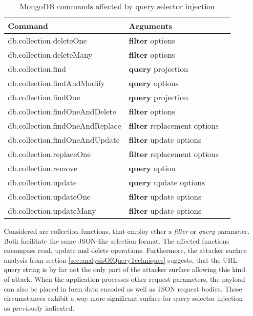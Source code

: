 \begin{table}[h]
 \sffamily
 \centering
 \begin{tabular}{lll}
  \textbf{Command} & \textbf{Arguments} \\ \hline
  db.collection.deleteOne         & \textbf{filter} options \\
  db.collection.deleteMany        & \textbf{filter} options \\
  db.collection.find              & \textbf{query} projection \\
  db.collection.findAndModify     & \textbf{query} options \\
  db.collection.findOne           & \textbf{query} projection \\
  db.collection.findOneAndDelete  & \textbf{filter} options \\
  db.collection.findOneAndReplace & \textbf{filter} replacement options \\
  db.collection.findOneAndUpdate  & \textbf{filter} update options \\
  db.collection.replaceOne        & \textbf{filter} replacement options \\
  db.collection.remove            & \textbf{query} option \\
  db.collection.update            & \textbf{query} update options \\
  db.collection.updateOne         & \textbf{filter} update options \\
  db.collection.updateMany        & \textbf{filter} update options \\
  \bottomrule 
 \end{tabular}
 \caption{MongoDB commands affected by query selector injection}
 \label{tab:mongo_commands_affected}
\end{table}

Considered are collection functions, that employ ether a \emph{filter} or \emph{query} parameter. Both facilitate the same JSON-like selection format. The affected functions encompass read, update and delete operations. Furthermore, the attacker surface analysis from section \ref{sec:analysisOfQueryTechniques} suggests, that the URL query string is by far not the only part of the attacker surface allowing this kind of attack. When the application processes other request parameters, the payload can also be placed in form data encoded as well as JSON request bodies. These circumstances exhibit a way more significant surface for query selector injection as previously indicated. \\

